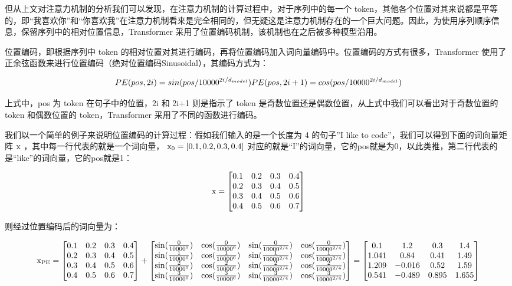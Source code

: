 \documentclass[
]{article}
\begin{document}
但从上文对注意力机制的分析我们可以发现，在注意力机制的计算过程中，对于序列中的每一个
token，其他各个位置对其来说都是平等的，即``我喜欢你''和``你喜欢我''在注意力机制看来是完全相同的，但无疑这是注意力机制存在的一个巨大问题。因此，为使用序列顺序信息，保留序列中的相对位置信息，Transformer
采用了位置编码机制，该机制也在之后被多种模型沿用。

\hspace{0pt}位置编码，即根据序列中 token
的相对位置对其进行编码，再将位置编码加入词向量编码中。位置编码的方式有很多，Transformer
使用了正余弦函数来进行位置编码（绝对位置编码Sinusoidal），其编码方式为：

\[
PE(pos, 2i) = sin(pos/10000^{2i/d_{model}})\\
PE(pos, 2i+1) = cos(pos/10000^{2i/d_{model}})
\]

\hspace{0pt}上式中，pos 为 token 在句子中的位置，2i 和 2i+1 则是指示了
token 是奇数位置还是偶数位置，从上式中我们可以看出对于奇数位置的 token
和偶数位置的 token，Transformer 采用了不同的函数进行编码。

我们以一个简单的例子来说明位置编码的计算过程：假如我们输入的是一个长度为
4 的句子''I like to code''，我们可以得到下面的词向量矩阵 \(\rm x\)
，其中每一行代表的就是一个词向量， \(\rm x_0=[0.1,0.2,0.3,0.4]\)
对应的就是``I''的词向量，它的pos就是为0，以此类推，第二行代表的是``like''的词向量，它的pos就是1：

\[
\rm x = \begin{bmatrix} 0.1 & 0.2 & 0.3 & 0.4 \\ 0.2 & 0.3 & 0.4 & 0.5 \\ 0.3 & 0.4 & 0.5 & 0.6 \\ 0.4 & 0.5 & 0.6 & 0.7 \end{bmatrix}
\]

\hspace{0pt}则经过位置编码后的词向量为：

\[
\rm x_{PE} = \begin{bmatrix} 0.1 & 0.2 & 0.3 & 0.4 \\ 0.2 & 0.3 & 0.4 & 0.5 \\ 0.3 & 0.4 & 0.5 & 0.6 \\ 0.4 & 0.5 & 0.6 & 0.7 \end{bmatrix} + \begin{bmatrix} \sin(\frac{0}{10000^0}) & \cos(\frac{0}{10000^0}) & \sin(\frac{0}{10000^{2/4}}) & \cos(\frac{0}{10000^{2/4}}) \\ \sin(\frac{1}{10000^0}) & \cos(\frac{1}{10000^0}) & \sin(\frac{1}{10000^{2/4}}) & \cos(\frac{1}{10000^{2/4}}) \\ \sin(\frac{2}{10000^0}) & \cos(\frac{2}{10000^0}) & \sin(\frac{2}{10000^{2/4}}) & \cos(\frac{2}{10000^{2/4}}) \\ \sin(\frac{3}{10000^0}) & \cos(\frac{3}{10000^0}) & \sin(\frac{3}{10000^{2/4}}) & \cos(\frac{3}{10000^{2/4}}) \end{bmatrix} = \begin{bmatrix} 0.1 & 1.2 & 0.3 & 1.4 \\ 1.041 & 0.84 & 0.41 & 1.49 \\ 1.209 & -0.016 & 0.52 & 1.59 \\ 0.541 & -0.489 & 0.895 & 1.655 \end{bmatrix}
\]
\end{document}
